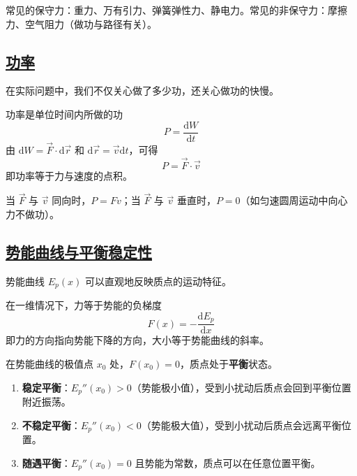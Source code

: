 \begin{remark}
    常见的保守力：重力、万有引力、弹簧弹性力、静电力。常见的非保守力：摩擦力、空气阻力（做功与路径有关）。
\end{remark}

\subsection{\protect\hyperlink{:}{功率}}

在实际问题中，我们不仅关心做了多少功，还关心做功的快慢。

\begin{definition}[功率]
    功率是单位时间内所做的功
    \begin{equation}
        P = \frac{\mathrm{d}W}{\mathrm{d}t}
    \end{equation}
    由 $\mathrm{d}W = \vec{F} \cdot \mathrm{d}\vec{r}$ 和 $\mathrm{d}\vec{r} = \vec{v}\mathrm{d}t$，可得
    \begin{equation}
        P = \vec{F} \cdot \vec{v}
    \end{equation}
    即功率等于力与速度的点积。
\end{definition}

\begin{remark}
    当 $\vec{F}$ 与 $\vec{v}$ 同向时，$P = Fv$；当 $\vec{F}$ 与 $\vec{v}$ 垂直时，$P = 0$（如匀速圆周运动中向心力不做功）。
\end{remark}

\subsection{\protect\hyperlink{:}{势能曲线与平衡稳定性}}

势能曲线 $E_p(x)$ 可以直观地反映质点的运动特征。

\begin{theorem}[力与势能的关系]
    在一维情况下，力等于势能的负梯度
    \begin{equation}
        F(x) = -\frac{\mathrm{d}E_p}{\mathrm{d}x}
    \end{equation}
    即力的方向指向势能下降的方向，大小等于势能曲线的斜率。
\end{theorem}

\begin{definition}[平衡点与稳定性]
    在势能曲线的极值点 $x_0$ 处，$F(x_0) = 0$，质点处于\textbf{平衡}状态。
    \begin{enumerate}
        \item \textbf{稳定平衡}：$E_p''(x_0) > 0$（势能极小值），受到小扰动后质点会回到平衡位置附近振荡。
        \item \textbf{不稳定平衡}：$E_p''(x_0) < 0$（势能极大值），受到小扰动后质点会远离平衡位置。
        \item \textbf{随遇平衡}：$E_p''(x_0) = 0$ 且势能为常数，质点可以在任意位置平衡。
    \end{enumerate}
\end{definition}

